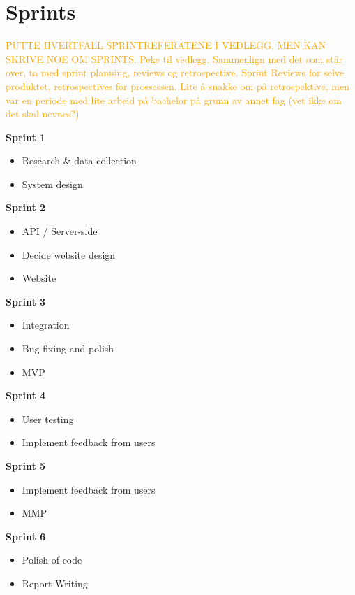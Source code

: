 \section{Sprints}

\textcolor{orange}{PUTTE HVERTFALL SPRINTREFERATENE I VEDLEGG, MEN KAN SKRIVE NOE OM SPRINTS. Peke til vedlegg. Sammenlign med det som står over, ta med sprint planning, reviews og retrospective. Sprint Reviews for selve produktet, retrospectives for prossessen. Lite å snakke om på retrospektive, men var en periode med lite arbeid på bachelor på grunn av annet fag (vet ikke om det skal nevnes?)}

\textbf{Sprint 1}
\begin{itemize}
    \item Research & data collection
    \item System design
\end{itemize}

\textbf{Sprint 2}
\begin{itemize}
    \item API / Server-side
    \item Decide website design
    \item Website
\end{itemize}

\textbf{Sprint 3}
\begin{itemize}
    \item Integration
    \item Bug fixing and polish
    \item MVP
\end{itemize}

\textbf{Sprint 4}
\begin{itemize}
    \item User testing
    \item Implement feedback from users
\end{itemize}

\textbf{Sprint 5}
\begin{itemize}
    \item Implement feedback from users
    \item MMP
\end{itemize}

\textbf{Sprint 6}
\begin{itemize}
    \item Polish of code
    \item Report Writing
\end{itemize}

